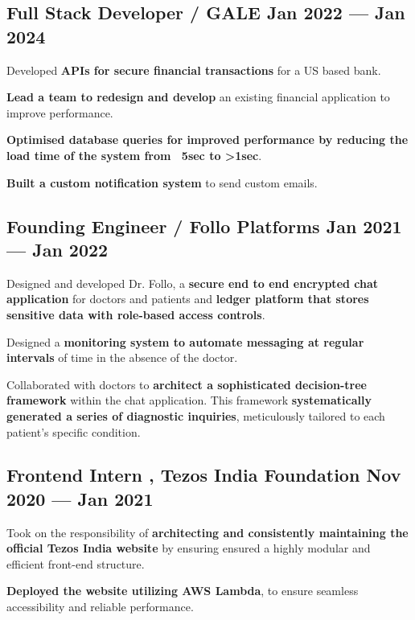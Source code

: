 \subsection{{Full Stack Developer / GALE \hfill Jan 2022 --- Jan 2024}}
\begin{zitemize}
\item Developed \textbf{APIs for secure financial transactions} for a US based bank.
\item \textbf{Lead a team to redesign and develop} an existing financial application to improve performance.
\item \textbf{Optimised database queries for improved performance by reducing the load time of the system from ~5sec to >1sec}.
\item \textbf{Built a custom notification system} to send custom emails.
\end{zitemize}

\subsection{{Founding Engineer / Follo Platforms \hfill Jan 2021 --- Jan 2022}}
\begin{zitemize}
\item Designed and developed Dr. Follo, a \textbf{secure end to end encrypted chat application} for doctors and patients and \textbf{ledger platform that stores sensitive data with role-based access controls}.
\item Designed a \textbf{monitoring system to automate messaging at regular intervals} of time in the absence of the doctor.
\item Collaborated with doctors to \textbf{architect a sophisticated decision-tree framework} within the chat application. This framework \textbf{systematically generated a series of diagnostic inquiries}, meticulously tailored to each patient's specific condition. 
\end{zitemize}

\subsection{{Frontend Intern , Tezos India Foundation \hfill Nov 2020 --- Jan 2021}}
\begin{zitemize}
\item Took on the responsibility of \textbf{architecting and consistently maintaining the official Tezos India website} by ensuring ensured a highly modular and efficient front-end structure.
\item \textbf{Deployed the website utilizing AWS Lambda}, to ensure seamless accessibility and reliable
performance. 
\end{zitemize}

